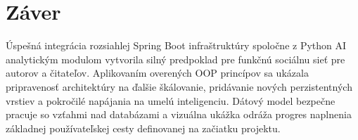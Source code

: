 \documentclass[12pt,a4paper]{article}
\begin{document}
\section{Záver}

Úspešná integrácia rozsiahlej Spring Boot infraštruktúry spoločne z Python AI analytickým modulom vytvorila silný predpoklad pre funkčnú sociálnu sieť pre autorov a čitateľov. Aplikovaním overených OOP princípov sa ukázala pripravenosť architektúry na ďalšie škálovanie, pridávanie nových perzistentných vrstiev a pokročilé napájania na umelú inteligenciu. Dátový model bezpečne pracuje so vzťahmi nad databázami a vizuálna ukážka odráža progres naplnenia základnej používateľskej cesty definovanej na začiatku projektu.
\end{document}
